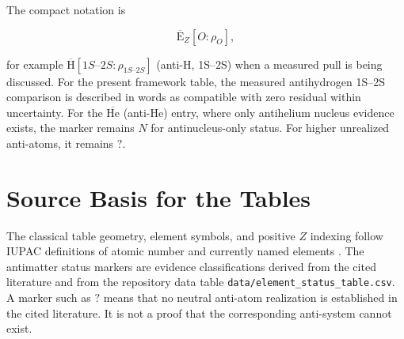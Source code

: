 \documentclass[11pt,a4paper]{article}
\newcommand{\antiH}{\ensuremath{\overline{\mathrm{H}}}}
\newcommand{\antiHe}{\ensuremath{\overline{\mathrm{He}}}}
\newcommand{\antiE}{\ensuremath{\overline{\mathrm{E}}}}
\begin{document}
The compact notation is

\begin{equation}
\antiE_Z[O:\rho_O],
\end{equation}

for example $\antiH[1S\text{--}2S:\rho_{1S\text{--}2S}]$ (anti-H, 1S--2S) when a measured pull is being discussed. For the present framework table, the measured antihydrogen 1S--2S comparison is described in words as compatible with zero residual within uncertainty. For the \antiHe{} (anti-He) entry, where only antihelium nucleus evidence exists, the marker remains $N$ for antinucleus-only status. For higher unrealized anti-atoms, it remains $?$.

\newpage
\section{Source Basis for the Tables}
\label{sec:source-basis}

The classical table geometry, element symbols, and positive $Z$ indexing follow IUPAC definitions of atomic number and currently named elements \cite{IUPACatomicnumber,IUPAC113118}. The antimatter status markers are evidence classifications derived from the cited literature and from the repository data table \texttt{data/element\_status\_table.csv}. A marker such as $?$ means that no neutral anti-atom realization is established in the cited literature. It is not a proof that the corresponding anti-system cannot exist.
\end{document}
